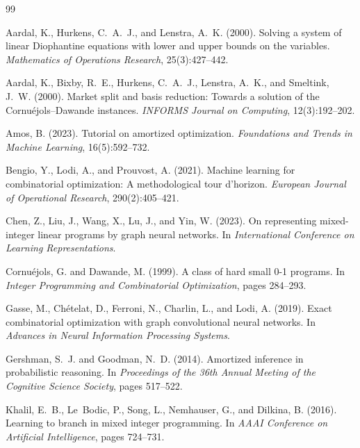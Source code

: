 \documentclass[preprint,12pt]{elsarticle}
\begin{document}
\begin{thebibliography}{99}

Aardal, K., Hurkens, C.~A.~J., and Lenstra, A.~K. (2000).
Solving a system of linear Diophantine equations with lower and upper bounds on the variables.
\emph{Mathematics of Operations Research}, 25(3):427--442.

Aardal, K., Bixby, R.~E., Hurkens, C.~A.~J., Lenstra, A.~K., and Smeltink, J.~W. (2000).
Market split and basis reduction: Towards a solution of the Cornu\'ejols--Dawande instances.
\emph{INFORMS Journal on Computing}, 12(3):192--202.

Amos, B. (2023).
Tutorial on amortized optimization.
\emph{Foundations and Trends in Machine Learning}, 16(5):592--732.

Bengio, Y., Lodi, A., and Prouvost, A. (2021).
Machine learning for combinatorial optimization: A methodological tour d'horizon.
\emph{European Journal of Operational Research}, 290(2):405--421.

Chen, Z., Liu, J., Wang, X., Lu, J., and Yin, W. (2023).
On representing mixed-integer linear programs by graph neural networks.
In \emph{International Conference on Learning Representations}.

Cornu\'ejols, G. and Dawande, M. (1999).
A class of hard small 0-1 programs.
In \emph{Integer Programming and Combinatorial Optimization}, pages 284--293.

Gasse, M., Ch\'etelat, D., Ferroni, N., Charlin, L., and Lodi, A. (2019).
Exact combinatorial optimization with graph convolutional neural networks.
In \emph{Advances in Neural Information Processing Systems}.

Gershman, S.~J. and Goodman, N.~D. (2014).
Amortized inference in probabilistic reasoning.
In \emph{Proceedings of the 36th Annual Meeting of the Cognitive Science Society}, pages 517--522.

Khalil, E.~B., Le~Bodic, P., Song, L., Nemhauser, G., and Dilkina, B. (2016).
Learning to branch in mixed integer programming.
In \emph{AAAI Conference on Artificial Intelligence}, pages 724--731.


\end{thebibliography}
\end{document}
